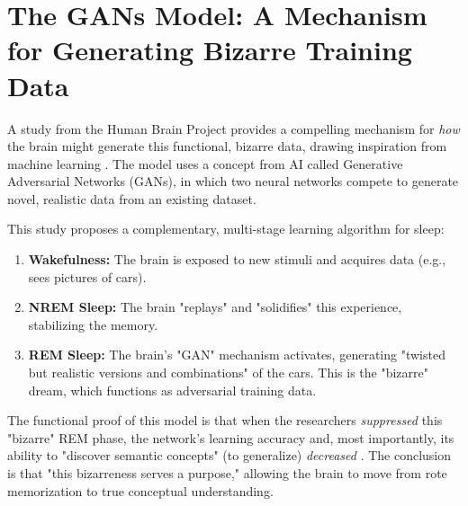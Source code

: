 \section{The GANs Model: A Mechanism for Generating Bizarre Training Data}\label{sec:gan_model}

A study from the Human Brain Project provides a compelling mechanism for \textit{how} the brain might generate this functional, bizarre data, drawing inspiration from machine learning \citep{franceschi2024gans}. The model uses a concept from AI called Generative Adversarial Networks (GANs), in which two neural networks compete to generate novel, realistic data from an existing dataset.

This study proposes a complementary, multi-stage learning algorithm for sleep:
\begin{enumerate}
    \item \textbf{Wakefulness:} The brain is exposed to new stimuli and acquires data (e.g., sees pictures of cars).
    \item \textbf{NREM Sleep:} The brain "replays" and "solidifies" this experience, stabilizing the memory.
    \item \textbf{REM Sleep:} The brain's "GAN" mechanism activates, generating "twisted but realistic versions and combinations" of the cars. This is the "bizarre" dream, which functions as adversarial training data.
\end{enumerate}

The functional proof of this model is
that when the researchers \textit{suppressed} this "bizarre" REM phase, the network's learning accuracy and, most importantly, its ability to "discover semantic concepts" (to generalize) \textit{decreased} \citep{franceschi2024gans}. The conclusion is that "this bizarreness serves a purpose," allowing the brain to move from rote memorization to true conceptual understanding.

